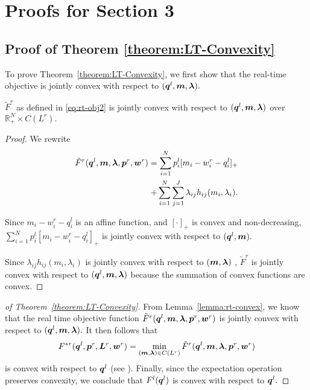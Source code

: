 \appendix

\section{Proofs for Section 3}

\subsection{Proof of Theorem \ref{theorem:LT-Convexity}}
\label{proof:convexity}

To prove Theorem~\ref{theorem:LT-Convexity}, we first show that the
real-time objective is jointly convex with respect to
$(\boldsymbol{q}^l,\boldsymbol{m},\boldsymbol{\lambda}).$
\begin{lemma}
	\label{lemma:rt-convex}
	$\tilde{F}^r$ as defined in \eqref{eq:rt-obj2} is jointly
        convex with respect to
        $(\boldsymbol{q}^l,\boldsymbol{m},\boldsymbol{\lambda})$ over
        $\mathbb{R}^N_+ \times C(L^r).$
\end{lemma}
\begin{proof}
	We rewrite
	\begin{eqnarray}
          \tilde{F}^r(\boldsymbol{q}^l,\boldsymbol{m},\boldsymbol{\lambda},\boldsymbol{p}^r,\boldsymbol{w}^r) = 
          \sum_{i=1}^{N} p^l_i [m_i-w^r_i-q^l_i]_+ \nonumber \\
          + \sum_{i=1}^{N}\sum_{j=1}^{J} \lambda_{ij} h_{ij}(m_i,\lambda_i).
	\end{eqnarray}
	
	
	Since $m_i-w^r_i-q^l_i$ is an affine function, and $[\cdot]_+$
        is convex and non-decreasing, $\sum_{i=1}^{N} p^l_i
        [m_i-w^r_i-q^l_i]_+$ is jointly convex with respect to
        $(\boldsymbol{q}^l,\boldsymbol{m}).$

	
	Since $\lambda_{ij} h_{ij}(m_i,\lambda_i)$ is jointly convex with respect to $(\boldsymbol{m},\boldsymbol{\lambda})$ , 
        $\tilde{F}^r$ is jointly convex with respect to
        $(\boldsymbol{q}^l,\boldsymbol{m},\boldsymbol{\lambda})$ because the
        summation of convex functions are convex.
\end{proof}

\begin{proof}[of Theorem~\ref{theorem:LT-Convexity}]
  From Lemma~\ref{lemma:rt-convex}, we know that the real time
  objective function
  $\tilde{F}^r(\boldsymbol{q}^l,\boldsymbol{m},\boldsymbol{\lambda},\boldsymbol{p}^r,\boldsymbol{w}^r)$
  is jointly convex with respect to
  $(\boldsymbol{q}^l,\boldsymbol{m},\boldsymbol{\lambda}).$ It then follows
  that $$F^{*r}(\boldsymbol{q}^l,\boldsymbol{p}^r, \boldsymbol{L}^r, \boldsymbol{w}^r)
  = \min_{(\boldsymbol{m},\boldsymbol{\lambda}) \in C(L^r)}
  \tilde{F}^r(\boldsymbol{q}^l,\boldsymbol{m},\boldsymbol{\lambda},\boldsymbol{p}^r,\boldsymbol{w}^r)$$
  is convex with respect to $\boldsymbol{q}^l$ (see
  \cite{boyd2004convex}). Finally, since the expectation operation
  preserves convexity, we conclude that $F^l(\boldsymbol{q}^l)$ is convex
  with respect to $\boldsymbol{q}^l.$
\end{proof}



